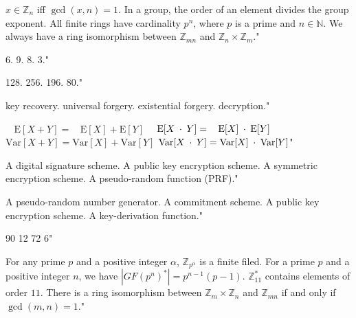 {$x \in \mathbb{Z}_n$ iff $\gcd(x,n)=1$.}
{In a group, the order of an element divides the group exponent.}
{All finite rings have cardinality $p^n$, where $p$ is a prime and $n \in \mathbb{N}$.}
{We always have a ring isomorphism between $\mathbb{Z}_{mn}$ and $\mathbb{Z}_n \times \mathbb{Z}_m$."}

{6.}
{9.}
{8.}
{3."}

{128.}
{256.}
{196.}
{80."}

{key recovery.}
{universal forgery.}
{existential forgery.}
{decryption."}

{$\phantom{\mathrm{ar}}\mathrm{E}[X+Y]=\phantom{\mathrm{ar}}\mathrm{E}[X]+\mathrm{E}[Y]$}
{$\phantom{\mathrm{ar}}\mathrm{E}[X \mkern4.5mu \cdot \mkern4.5mu Y]=\phantom{\mathrm{ar}}\mathrm{E}[X] \mkern4.5mu \cdot \mkern4.5mu \mathrm{E}[Y]$}
{$\mathrm{Var}[X+Y]=\mathrm{Var}[X]+\mathrm{Var}[Y]$}
{$\mathrm{Var}[X \mkern4.5mu \cdot \mkern4.5mu Y]=\mathrm{Var}[X] \mkern4.5mu \cdot \mkern4.5mu \mathrm{Var}[Y]$"}

{A digital signature scheme.}
{A public key encryption scheme.}
{A symmetric encryption scheme.}
{A pseudo-random function (PRF)."}

{A pseudo-random number generator.}
{A commitment scheme.}
{A public key encryption scheme.}
{A key-derivation function."}

{90}
{12}
{72}
{6"}

{For any prime $p$ and a positive integer $\alpha$, $\mathbb{Z}_{p^\alpha}$ is a finite filed.}
{For a prime $p$ and a positive integer $n$, we have $|GF(p^n)^*|=p^{n-1}(p-1)$.}
{$\mathbb{Z}_{11}^*$ contains elements of order $11$.}
{There is a ring isomorphism between $\mathbb{Z}_m \times \mathbb{Z}_n$ and $\mathbb{Z}_{mn}$ if and only if $\gcd(m,n)=1$."}

